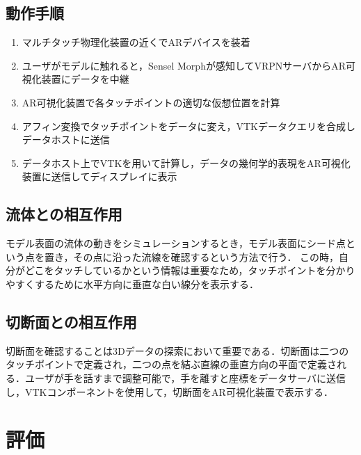 \documentclass[a4paper,10pt,twocolumn,uplatex]{jsarticle}
\begin{document}
\subsection{動作手順}
\begin{enumerate}
\item マルチタッチ物理化装置の近くでARデバイスを装着
\item ユーザがモデルに触れると，Sensel Morphが感知してVRPNサーバからAR可視化装置にデータを中継
\item AR可視化装置で各タッチポイントの適切な仮想位置を計算
\item アフィン変換でタッチポイントをデータに変え，VTKデータクエリを合成しデータホストに送信
\item データホスト上でVTKを用いて計算し，データの幾何学的表現をAR可視化装置に送信してディスプレイに表示
\end{enumerate}

\subsection{流体との相互作用}
モデル表面の流体の動きをシミュレーションするとき，モデル表面にシード点という点を置き，その点に沿った流線を確認するという方法で行う．
この時，自分がどこをタッチしているかという情報は重要なため，タッチポイントを分かりやすくするために水平方向に垂直な白い線分を表示する．

\subsection{切断面との相互作用}
切断面を確認することは3Dデータの探索において重要である．切断面は二つのタッチポイントで定義され，二つの点を結ぶ直線の垂直方向の平面で定義される．ユーザが手を話すまで調整可能で，手を離すと座標をデータサーバに送信し，VTKコンポーネントを使用して，切断面をAR可視化装置で表示する．

\section{評価}
\end{document}
